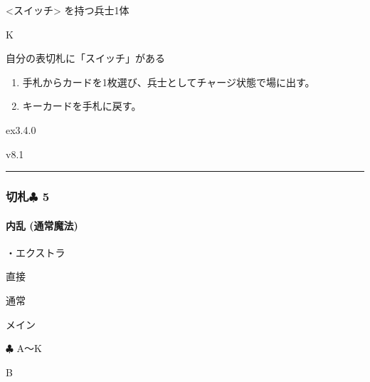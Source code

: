 \documentclass[letterpaper,10pt,dvipdfmx]{sphinxmanual}
\begin{document}
\sphinxAtStartPar
{} \textless{}スイッチ\textgreater{} を持つ兵士1体

\sphinxAtStartPar
{} K

\sphinxAtStartPar
{}

\sphinxAtStartPar
自分の表切札に「スイッチ」がある

\sphinxAtStartPar
{}
\begin{enumerate}
%
\item {} 
\sphinxAtStartPar
手札からカードを1枚選び、兵士としてチャージ状態で場に出す。

\item {} 
\sphinxAtStartPar
キーカードを手札に戻す。

\end{enumerate}

\sphinxAtStartPar
{}  ex3.4.0

\sphinxAtStartPar
{}  v8.1


\bigskip\hrule\bigskip



\subsubsection{切札{\normalsize $\clubsuit$} 5}
\label{\detokenize{auto/frameActionlist:id74}}

\paragraph{内乱 (通常魔法)}
\label{\detokenize{auto/frameActionlist:act-civilwar}}\label{\detokenize{auto/frameActionlist:id75}}
\sphinxAtStartPar
{}

\sphinxAtStartPar
・エクストラ

\sphinxAtStartPar
{} 直接

\sphinxAtStartPar
{} 通常

\sphinxAtStartPar
{} メイン

\sphinxAtStartPar
{} {\normalsize $\clubsuit$} A〜K

\sphinxAtStartPar
{} B

\sphinxAtStartPar
{}
\end{document}
